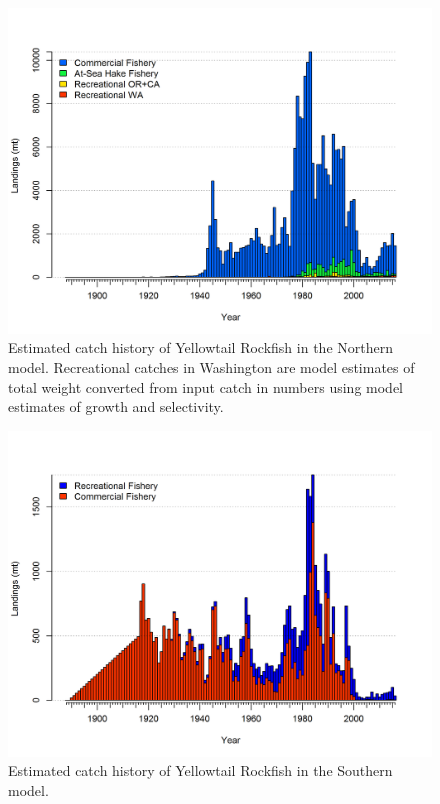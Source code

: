 \documentclass[12pt,]{article}
\begin{document}
\begin{figure}[htbp]
\centering
\includegraphics{./tex2pdf.8516/8616d24217d6e2dafcc25b02dd3f642fb3bfe2cd.png}
\caption{Estimated catch history of Yellowtail Rockfish in the Northern
model. Recreational catches in Washington are model estimates of total
weight converted from input catch in numbers using model estimates of
growth and selectivity.\label{fig:r4ss_catch_N}}
\end{figure}

\begin{figure}[htbp]
\centering
\includegraphics{./tex2pdf.8516/59e7430368fa3ab4a2073f82708e5c840614580b.png}
\caption{Estimated catch history of Yellowtail Rockfish in the Southern
model. \label{fig:r4ss_catch_S}}
\end{figure}
\end{document}
